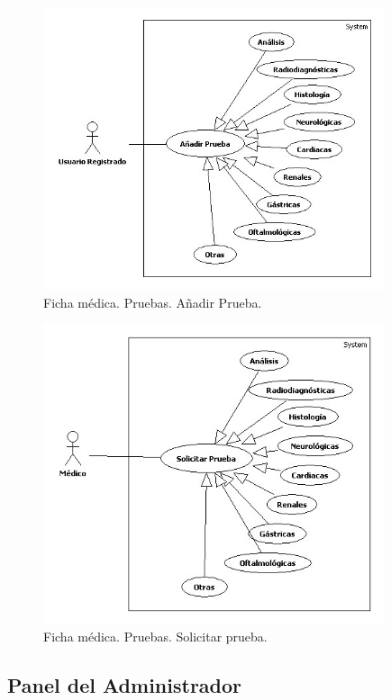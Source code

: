 \documentclass[a4paper,oneside,11pt]{book}
\begin{document}
				\begin{figure}[H]
				  \centering
				    \includegraphics[width=10cm]{img/jpg/casos_uso/Add_Prueba.jpg}
				  \caption{Ficha médica. Pruebas. Añadir Prueba.}
				  \label{fig:pruebas_add_fic}
				\end{figure}
				
				\begin{figure}[H]
				  \centering
				    \includegraphics[width=10cm]{img/jpg/casos_uso/Solicitar_Prueba.jpg}
				  \caption{Ficha médica. Pruebas. Solicitar prueba.}
				  \label{fig:pruebas_sol_fic}
				\end{figure}
			
	
		\subsection{Panel del Administrador} %
		\label{sec:panel_del_administrador}
		
\end{document}
